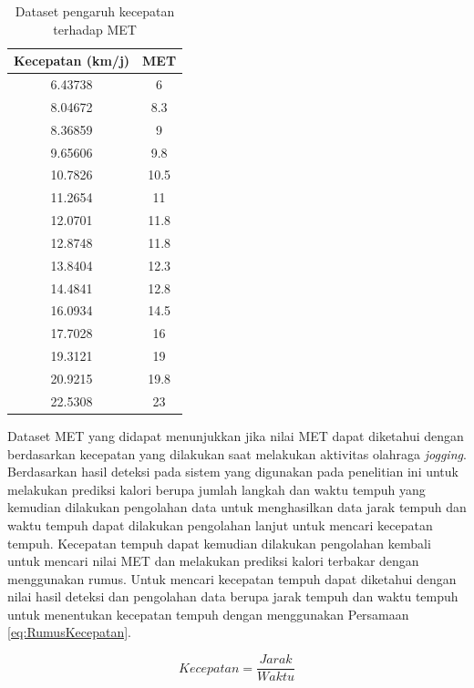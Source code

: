 \begin{longtable}{|c|c|}
  \caption{Dataset pengaruh kecepatan terhadap MET}
  \label{tb:DatasetMET}                                   \\
  \hline
  \rowcolor[HTML]{C0C0C0}
  \textbf{Kecepatan (km/j)} & \textbf{MET}  \\
  \hline
  6.43738  & 6    \\
  \hline
  8.04672   & 8.3    \\
  \hline
  8.36859   & 9    \\
  \hline
  9.65606   & 9.8    \\
  \hline
  10.7826   & 10.5    \\
  \hline
  11.2654   & 11    \\
  \hline
  12.0701   & 11.8    \\
  \hline
  12.8748   & 11.8    \\
  \hline
  13.8404   & 12.3    \\
  \hline
  14.4841   & 12.8    \\
  \hline
  16.0934   & 14.5    \\
  \hline
  17.7028   & 16    \\
  \hline
  19.3121   & 19    \\
  \hline
  20.9215   & 19.8    \\
  \hline
  22.5308   & 23    \\
  \hline
\end{longtable}
\clearpage

Dataset MET yang didapat menunjukkan jika nilai MET dapat diketahui dengan berdasarkan kecepatan yang dilakukan saat melakukan aktivitas olahraga \emph{jogging}. Berdasarkan hasil deteksi pada sistem yang digunakan pada penelitian ini untuk melakukan prediksi kalori berupa jumlah langkah dan waktu tempuh yang kemudian dilakukan pengolahan data untuk menghasilkan data jarak tempuh dan waktu tempuh dapat dilakukan pengolahan lanjut untuk mencari kecepatan tempuh. Kecepatan tempuh dapat kemudian dilakukan pengolahan kembali untuk mencari nilai MET dan melakukan prediksi kalori terbakar dengan menggunakan rumus. Untuk mencari kecepatan tempuh dapat diketahui dengan nilai hasil deteksi dan pengolahan data berupa jarak tempuh dan waktu tempuh untuk menentukan kecepatan tempuh dengan menggunakan Persamaan \ref{eq:RumusKecepatan}.

\begin{equation}
  \label{eq:RumusKecepatan}
  Kecepatan = \frac{Jarak}{Waktu}
\end{equation}


